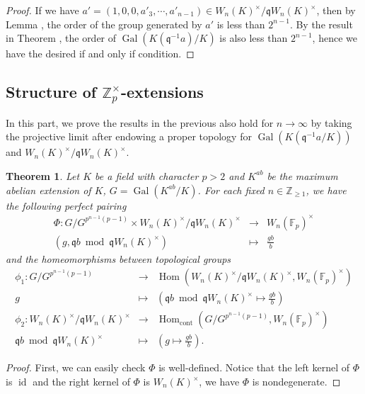 \documentclass{proc-l}
\newtheorem{theorem}{Theorem}[section]
\theoremstyle{definition}
\theoremstyle{remark}
\numberwithin{equation}{section}
\DeclareMathOperator{\Gal}{Gal}
\DeclareMathOperator{\Hom}{Hom}
\DeclareMathOperator{\cont}{cont}
\DeclareMathOperator{\id}{id}
\begin{document}
{\begin{proof}
If we have $a'=(1,0,0,a'_3,\cdots,a'_{n-1})\in W_n(K)^\times/\mathfrak qW_n(K)^\times$, then by Lemma \boxed{\ref{2.17}}, the order of the group generated by $a'$ is less than $2^{n-1}$. By the result in Theorem \boxed{\ref{038}}, the order of $\Gal(K(\mathfrak q^{-1}a)/K)$ is also less than $2^{n-1}$, hence we have the desired if and only if condition.
\end{proof}
\subsection{Structure of $\mathbb Z_p^\times$-extensions}\label{s3.3}
In this part, we prove the results in the previous also hold for $n\rightarrow\infty$ by taking the projective limit after endowing a proper topology for $\Gal(K(\mathfrak q^{-1}a/K))$ and $W_n(K)^\times/\mathfrak qW_n(K)^\times$.
\begin{theorem}\label{thm3}
Let $K$ be a field with character $p>2$ and $K^{ab}$ be the maximum abelian extension of $K$, $G=\Gal(K^{ab}/K)$. For each fixed $n\in\mathbb Z_{\geq1}$, we have the following perfect pairing 
\begin{eqnarray*}
\Phi:G/G^{p^{n-1}(p-1)}\times W_n(K)^\times/\mathfrak qW_{n}(K)^\times&\rightarrow& W_n(\mathbb F_p)^\times\\
(g,\mathfrak q b\bmod {\mathfrak qW_n(K)^\times})&\mapsto&\frac{gb}{b}
\end{eqnarray*}
and the homeomorphisms between topological groups
\begin{eqnarray*}
\phi_1:G/G^{p^{n-1}(p-1)}&\rightarrow&\Hom(W_n(K)^\times/\mathfrak qW_n(K)^\times,W_n(\mathbb F_p)^\times)\\
g&\mapsto&(\mathfrak qb\bmod\mathfrak qW_n(K)^\times\mapsto\frac{gb}{b})\\
\phi_2:W_n(K)^\times/\mathfrak qW_n(K)^\times&\rightarrow&\Hom_{\cont}(G/G^{p^{n-1}(p-1)},W_n(\mathbb F_p)^\times)\\
\mathfrak qb\bmod\mathfrak qW_n(K)^\times&\mapsto&(g\mapsto\frac{gb}{b}).
\end{eqnarray*}
\end{theorem}
\begin{proof}
First, we can easily check $\Phi$ is well-defined. Notice that the left kernel of $\Phi$ is $\id$ and the right kernel of $\Phi$ is $W_n(K)^\times$, we have $\Phi$ is nondegenerate.

\end{proof}}
\end{document}
